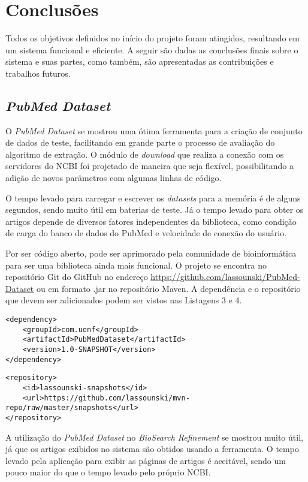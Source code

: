 \chapter{Conclusões}

Todos os objetivos definidos no início do projeto foram atingidos, resultando em um sistema funcional e eficiente. A seguir são dadas as conclusões finais sobre o sistema e suas partes, como também, são apresentadas as contribuições e trabalhos futuros.

\section{\emph{PubMed Dataset}}
O \emph{PubMed Dataset} se mostrou uma ótima ferramenta para a criação de conjunto de dados de teste, facilitando em grande parte o processo de avaliação do algoritmo de extração. O módulo de \emph{download} que realiza a conexão com os servidores do NCBI foi projetado de maneira que seja flexível, possibilitando a adição de novos parâmetros com algumas linhas de código.

O tempo levado para carregar e escrever os \emph{datasets} para a memória é de alguns segundos, sendo muito útil em baterias de teste. Já o tempo levado para obter os artigos depende de diversos fatores independentes da biblioteca, como condição de carga do banco de dados do PubMed e velocidade de conexão do usuário.

Por ser código aberto, pode ser aprimorado pela comunidade de bioinformática para ser uma biblioteca ainda mais funcional. O projeto se encontra no repositório Git do GitHub no endereço \url{https://github.com/lassounski/PubMed-Dataset} ou em formato .jar no repositório Maven. A dependência e o repositório que devem ser adicionados podem ser vistos nas Listagens 3 e 4.
\begin{lstlisting}
<dependency>
    <groupId>com.uenf</groupId>
    <artifactId>PubMedDataset</artifactId>
    <version>1.0-SNAPSHOT</version>
</dependency>
\end{lstlisting}
\begin{lstlisting}
<repository>
    <id>lassounski-snapshots</id>
    <url>https://github.com/lassounski/mvn-repo/raw/master/snapshots</url>
</repository>
\end{lstlisting}

A utilização do \emph{PubMed Dataset} no \emph{BioSearch Refinement} se mostrou muito útil, já que os artigos exibidos no sistema são obtidos usando a ferramenta. O tempo levado pela aplicação para exibir as páginas de artigos é aceitável, sendo um pouco maior do que o tempo levado pelo próprio NCBI.

